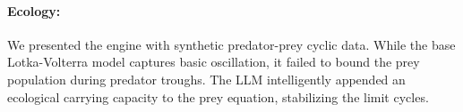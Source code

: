 \paragraph{Ecology:} We presented the engine with synthetic predator-prey cyclic data. While the base Lotka-Volterra model captures basic oscillation, it failed to bound the prey population during predator troughs. The LLM intelligently appended an ecological carrying capacity to the prey equation, stabilizing the limit cycles.

